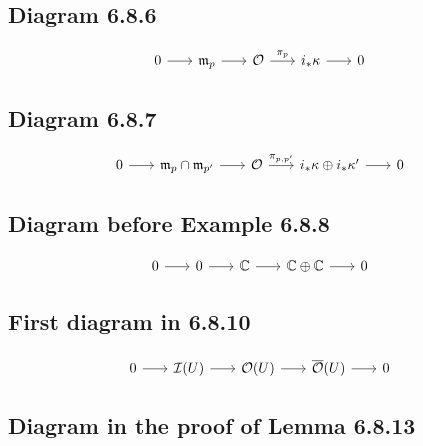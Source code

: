 \documentclass[leqno]{amsart}
\begin{document}
	\subsection*{Diagram 6.8.6}

	\begin{equation*}
		\begin{tikzcd}[sep=scriptsize]
			0 \arrow{r} & \mathfrak{m}_p \arrow{r} & \mathcal{O} \arrow{r}{\pi_p} & i_{\ast} \kappa \arrow{r} & 0
		\end{tikzcd}
	\end{equation*}

	\subsection*{Diagram 6.8.7}

	\begin{equation*}
		\begin{tikzcd}[sep=scriptsize]
			0 \arrow{r} & \mathfrak{m}_p \cap \mathfrak{m}_{p^{\prime}} \arrow{r} & \mathcal{O} \arrow{r}{\pi_{p,p^{\prime}}} & i_{\ast} \kappa \oplus i_{\ast} \kappa^{\prime} \arrow{r} & 0
		\end{tikzcd}
	\end{equation*}

	\subsection*{Diagram before Example 6.8.8}

	\begin{equation*}
		\begin{tikzcd}[sep=scriptsize]
			0 \arrow{r} & 0 \arrow{r} & \mathbb{C} \arrow{r} & \mathbb{C} \oplus \mathbb{C} \arrow{r} & 0
		\end{tikzcd}
	\end{equation*}

	\subsection*{First diagram in 6.8.10}

	\begin{equation*}
		\begin{tikzcd}[sep=scriptsize]
			0 \arrow{r} & \mathcal{I}(U) \arrow{r} & \mathcal{O}(U) \arrow{r} & \overline{\mathcal{O}}(U) \arrow{r} & 0
		\end{tikzcd}
	\end{equation*}

	\subsection*{Diagram in the proof of Lemma 6.8.13}
\end{document}
